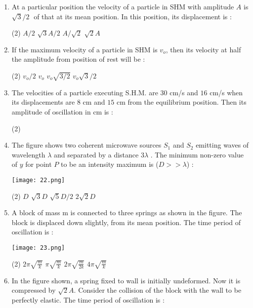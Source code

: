 \documentclass{article}
\begin{document}
\begin{enumerate}
\begin{tasks}
\end{tasks}
\item At a particular position the velocity of a particle in SHM with amplitude \(A\) is \(\sqrt{3}/2\;\) of that at its mean position. In this position, its displacement is :
\begin{tasks}(2)
\task \(A/2\)
\task \(\sqrt{3}A/2\)
\task \(A/\sqrt{2}\)
\task \(\sqrt{2}A\)
\end{tasks}
\item If the maximum velocity of a particle in SHM is \(v_o\), then its velocity at half the amplitude from position of rest will be :
\begin{tasks}(2)
\task \(v_o/2\)
\task \(v_o\)
\task \(v_o \sqrt{3/2}\)
\task \(v_o\sqrt{3}/2\)
\end{tasks}
\item The velocities of a particle executing S.H.M. are \(30\) cm/s and \(16\) cm/s when its displacements are \(8\) cm and \(15\) cm from the equilibrium position. Then its amplitude of oscillation in cm is :
\begin{tasks}(2)
\end{tasks}
\item The figure shows two coherent microwave sources \(S_1\) and \(S_2\) emitting waves of wavelength \(\lambda\) and separated by a distance \(3\lambda\) . The minimum non-zero value of \(y\) for point \(P\) to be an intensity maximum is (\(D>>\lambda\)) :

\texttt{[image: 22.png]}

\begin{tasks}(2)
\task \(D\)
\task \(\sqrt{3}D\)
\task \(\sqrt{5}D/2\)
\task \(2\sqrt{2}D\)
\end{tasks}
\item A block of mass m is connected to three springs as shown in the figure. The block is displaced down slightly, from its mean position. The time period of oscillation is :

\texttt{[image: 23.png]}

\begin{tasks}(2)
\task \( \displaystyle 2\pi \sqrt{\frac{m}{k}} \)
\task \(\displaystyle \pi \sqrt{\frac{m}{k}} \)
\task \( \displaystyle2\pi \sqrt{\frac{m}{2k}} \)
\task \( \displaystyle4\pi \sqrt{\frac{m}{k}} \)
\end{tasks}
\item In the figure shown, a spring fixed to wall is initially undeformed. Now it is compressed by \(\sqrt{2}A\). Consider the collision of the block with the wall to be perfectly elastic. The time period of oscillation is :


\end{enumerate}
\end{document}
